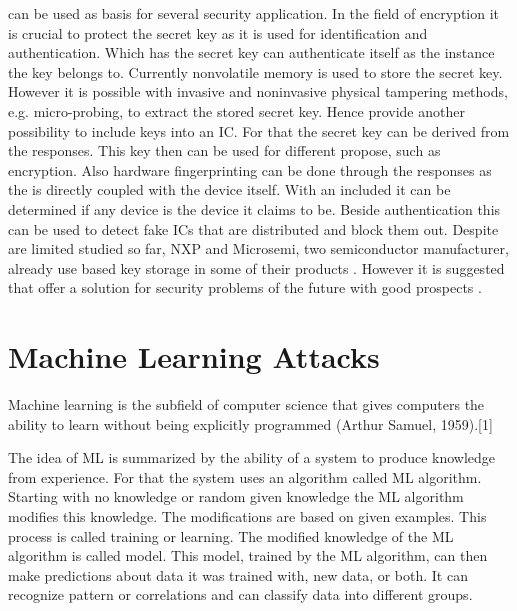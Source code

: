 \pufs can be used as basis for several security application.
In the field of encryption it is crucial to protect the secret key as it is used for identification and authentication.
Which has the secret key can authenticate itself as the instance the key belongs to.
Currently nonvolatile memory is used to store the secret key.
However it is possible with invasive and noninvasive physical tampering methods, e.g. micro-probing, to extract the stored secret key. %
Hence \pufs provide another possibility to include keys into an \ac{IC}.
For that the secret key can be derived from the \puf responses.
This key then can be used for different propose, such as encryption. %
Also hardware fingerprinting can be done through the \puf responses as the \puf is directly coupled with the device itself.
With an included \puf it can be determined if any device is the device it claims to be.
Beside authentication this can be used to detect fake \acp{IC} that are distributed and block them out. %
Despite \puf are limited studied so far, \acl{NXP} and Microsemi, two semiconductor manufacturer, already use \puf based key storage in some of their products \cite{Becker2015ThePUFs}.
However it is suggested that \pufs offer a solution for security problems of the future with good prospects \cite{Tajik2014PhysicalPUFs}.

\section{Machine Learning Attacks}

Machine learning is the subfield of computer science that gives computers the ability to learn without being explicitly programmed (Arthur Samuel, 1959).[1] 


The idea of \acf{ML} is summarized by the ability of a system to produce knowledge from experience.
For that the system uses an algorithm called \ac{ML} algorithm.
Starting with no knowledge or random given knowledge the \ac{ML} algorithm modifies this knowledge.
The modifications are based on given examples. 
This process is called training or learning.
The modified knowledge of the \ac{ML} algorithm is called model.
This model, trained by the \ac{ML} algorithm, can then make predictions about data it was trained with, new data, or both.
It can recognize pattern or correlations and can classify data into different groups.

